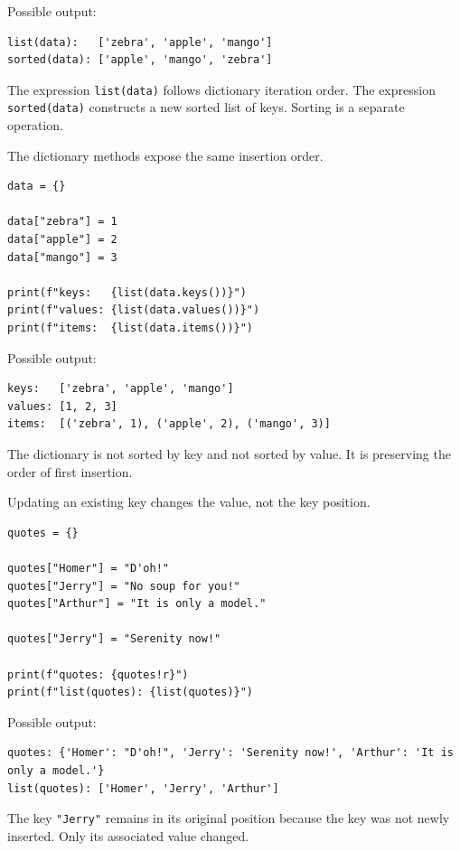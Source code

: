 Possible output:

\begin{verbatim}
list(data):   ['zebra', 'apple', 'mango']
sorted(data): ['apple', 'mango', 'zebra']
\end{verbatim}

The expression \texttt{list(data)} follows dictionary iteration order. The expression \texttt{sorted(data)} constructs a new sorted list of keys. Sorting is a separate operation.

The dictionary methods expose the same insertion order.

\begin{verbatim}
data = {}

data["zebra"] = 1
data["apple"] = 2
data["mango"] = 3

print(f"keys:   {list(data.keys())}")
print(f"values: {list(data.values())}")
print(f"items:  {list(data.items())}")
\end{verbatim}

Possible output:

\begin{verbatim}
keys:   ['zebra', 'apple', 'mango']
values: [1, 2, 3]
items:  [('zebra', 1), ('apple', 2), ('mango', 3)]
\end{verbatim}

The dictionary is not sorted by key and not sorted by value. It is preserving the order of first insertion.

Updating an existing key changes the value, not the key position.

\begin{verbatim}
quotes = {}

quotes["Homer"] = "D'oh!"
quotes["Jerry"] = "No soup for you!"
quotes["Arthur"] = "It is only a model."

quotes["Jerry"] = "Serenity now!"

print(f"quotes: {quotes!r}")
print(f"list(quotes): {list(quotes)}")
\end{verbatim}

Possible output:

\begin{verbatim}
quotes: {'Homer': "D'oh!", 'Jerry': 'Serenity now!', 'Arthur': 'It is only a model.'}
list(quotes): ['Homer', 'Jerry', 'Arthur']
\end{verbatim}

The key \texttt{"Jerry"} remains in its original position because the key was not newly inserted. Only its associated value changed.

